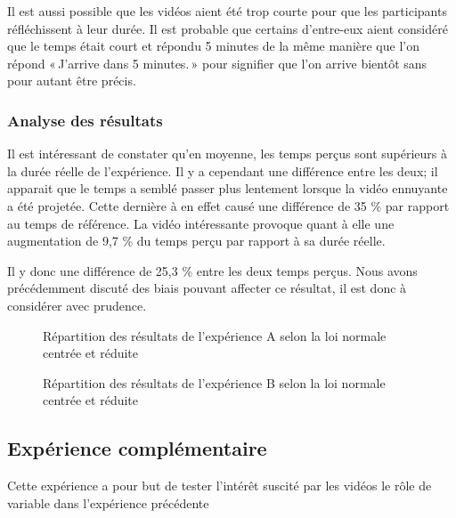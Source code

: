 \documentclass[12pt,fleqn,oneside,openany]{book} %
\begin{document}
Il est aussi possible que les vidéos aient été trop courte pour que les participants réfléchissent à leur durée. Il est probable que certains d'entre-eux aient considéré que le temps était court et répondu 5 minutes de la même manière que l'on répond «\,J'arrive dans 5 minutes.\,» pour signifier que l'on arrive bientôt sans pour autant être précis.



\subsubsection{Analyse des résultats} \label{sssec:analyseResult1.1}
Il est intéressant de constater qu'en moyenne, les temps perçus sont supérieurs à la durée réelle de l'expérience. Il y a cependant une différence entre les deux; il apparait que le temps a semblé passer plus lentement lorsque la vidéo ennuyante a été projetée. Cette dernière à en effet causé une différence de 35 \% par rapport au temps de référence. La vidéo intéressante provoque quant à elle une augmentation de 9,7 \% du temps perçu par rapport à sa durée réelle.

Il y donc une différence de 25,3 \% entre les deux temps perçus. Nous avons précédemment discuté des biais pouvant affecter ce résultat, il est donc à considérer avec prudence.

\begin{figure}[h] 
	\caption{Répartition des résultats de l'expérience A selon la loi normale centrée et réduite}
\end{figure}

\begin{figure}[h] 
	\caption{Répartition des résultats de l'expérience B selon la loi normale centrée et réduite}
\end{figure}

\subsection{Expérience complémentaire} \label{ssec:exp2.2}
Cette expérience a pour but de tester l'intérêt suscité par les vidéos le rôle de variable dans l'expérience précédente
\end{document}
